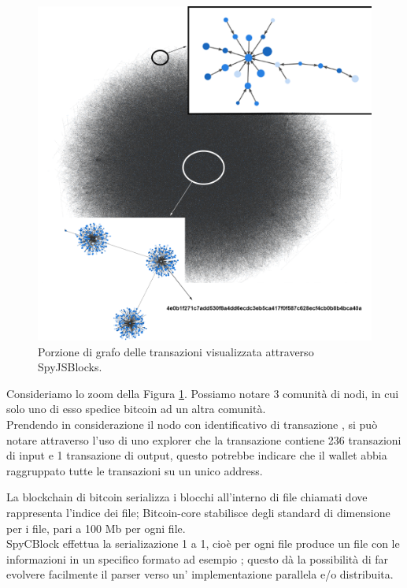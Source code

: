 \begin{figure}
\centering
\includegraphics[scale=1.2]{images/demo/graph_tx_demo_presentation.png}
\caption{Porzione di grafo delle transazioni visualizzata attraverso SpyJSBlocks.}
\label{fig:visgraphTx}
\end{figure}

\begin{example}
Consideriamo lo zoom  della Figura \ref{fig:visgraphTx}. Possiamo notare 3 comunità di nodi, in cui solo uno di esso spedice bitcoin ad un altra comunità.\\
  Prendendo in considerazione il nodo con  identificativo di transazione , si può notare attraverso l'uso di uno explorer che la transazione contiene 236 transazioni di input e 1 transazione di output, questo potrebbe indicare che il wallet abbia raggruppato tutte le transazioni su un unico address.
\end{example}

La blockchain di bitcoin serializza i blocchi all'interno di file chiamati  dove  rappresenta l'indice dei file; Bitcoin-core stabilisce degli standard di dimensione per i file, pari a 100 Mb per ogni file.\\
SpyCBlock effettua la serializazione 1 a 1, cioè per ogni file  produce un file con le informazioni in un specifico formato ad esempio ; questo dà la possibilità di far evolvere facilmente il parser verso un' implementazione parallela e/o distribuita.

